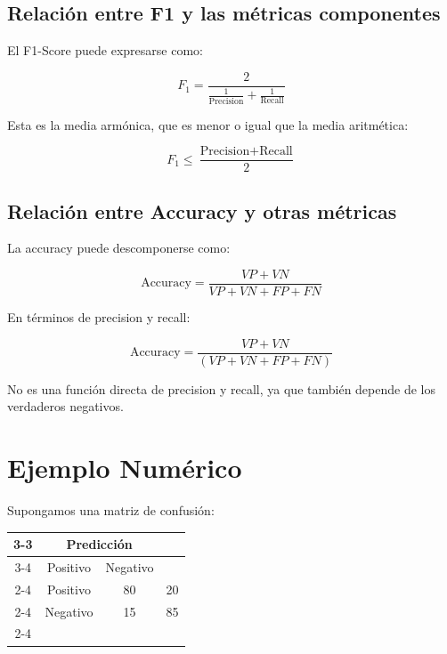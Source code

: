 \documentclass[12pt]{article}
\begin{document}

\subsection{Relación entre F1 y las métricas componentes}

El F1-Score puede expresarse como:

\begin{equation}
F_1 = \frac{2}{\frac{1}{\text{Precision}} + \frac{1}{\text{Recall}}}
\end{equation}

Esta es la media armónica, que es menor o igual que la media aritmética:

\begin{equation}
F_1 \leq \frac{\text{Precision} + \text{Recall}}{2}
\end{equation}

\subsection{Relación entre Accuracy y otras métricas}

La accuracy puede descomponerse como:

\begin{equation}
\text{Accuracy} = \frac{VP + VN}{VP + VN + FP + FN}
\end{equation}

En términos de precision y recall:

\begin{equation}
\text{Accuracy} = \frac{VP + VN}{(VP + VN + FP + FN)}
\end{equation}

No es una función directa de precision y recall, ya que también depende de los verdaderos negativos.

\section{Ejemplo Numérico}

Supongamos una matriz de confusión:

\begin{table}[h]
\centering
\begin{tabular}{c|c|c|c|}
\cline{3-3}
\multicolumn{2}{c|}{} & \multicolumn{2}{c}{Predicción} \\
\cline{3-4}
\multicolumn{2}{c|}{} & Positivo & Negativo \\
\cline{2-4}
\multirow{2}{*}{Real} & Positivo & 80 & 20 \\
\cline{2-4}
& Negativo & 15 & 85 \\
\cline{2-4}
\end{tabular}
\end{table}
\end{document}

